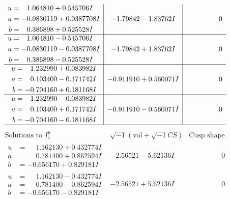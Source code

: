 \documentclass[1p]{elsarticle_modified}
\theoremstyle{definition}
\newcommand{\I}{\sqrt{-1}}
\begin{document}
$$\begin{array}{c|c|c}
\begin{aligned}
u &= \phantom{-}1.064810 + 0.545706 I \\
a &= -0.0830119 + 0.0387708 I \\
b &= \phantom{-}0.386898 + 0.525528 I\end{aligned}
 & -1.79842 - 1.83762 I & \phantom{-0.000000 } 0 \\ \hline\begin{aligned}
u &= \phantom{-}1.064810 - 0.545706 I \\
a &= -0.0830119 - 0.0387708 I \\
b &= \phantom{-}0.386898 - 0.525528 I\end{aligned}
 & -1.79842 + 1.83762 I & \phantom{-0.000000 } 0 \\ \hline\begin{aligned}
u &= \phantom{-}1.232990 + 0.083982 I \\
a &= \phantom{-}0.103400 - 0.171742 I \\
b &= -0.704160 + 0.181168 I\end{aligned}
 & -0.911910 + 0.560071 I & \phantom{-0.000000 } 0 \\ \hline\begin{aligned}
u &= \phantom{-}1.232990 - 0.083982 I \\
a &= \phantom{-}0.103400 + 0.171742 I \\
b &= -0.704160 - 0.181168 I\end{aligned}
 & -0.911910 - 0.560071 I & \phantom{-0.000000 } 0\\
 \hline 
 \end{array}$$\newpage$$\begin{array}{c|c|c}  
\text{Solutions to }I^u_{1}& \I (\text{vol} + \sqrt{-1}CS) & \text{Cusp shape}\\
 \hline 
\begin{aligned}
u &= \phantom{-}1.162130 + 0.432774 I \\
a &= \phantom{-}0.781400 + 0.862594 I \\
b &= -0.656170 + 0.829181 I\end{aligned}
 & -2.56521 - 5.62136 I & \phantom{-0.000000 } 0 \\ \hline\begin{aligned}
u &= \phantom{-}1.162130 - 0.432774 I \\
a &= \phantom{-}0.781400 - 0.862594 I \\
b &= -0.656170 - 0.829181 I\end{aligned}
 & -2.56521 + 5.62136 I & \phantom{-0.000000 } 0 \\ \hline\begin{aligned}

\end{aligned}
\end{array}$$
\end{document}
